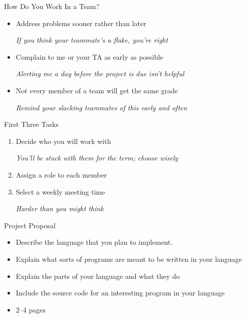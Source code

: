 \documentclass{plt}
\begin{document}
\begin{frame}{How Do You Work In a Team?}


  \begin{itemize}
    \itemsep=15pt
\item Address problems sooner rather than later

\emph{If you think your teammate's a flake, you're right}

\item Complain to me or your TA as early as possible

\emph{Alerting me a day before the project is due isn't helpful}

\item Not every member of a team will get the same grade

\emph{Remind your slacking teammates of this early and often}
\end{itemize}

\end{frame}

\begin{frame}{First Three Tasks}

  \begin{enumerate}
    \itemsep=15pt
\item Decide who you will work with

\emph{You'll be stuck with them for the term; choose wisely}

\item Assign a role to each member

\item Select a weekly meeting time

\emph{Harder than you might think}
\end{enumerate}


\end{frame}

\begin{frame}{Project Proposal}

  \begin{itemize}
    \itemsep=15pt

\item Describe the language that you plan to implement.

\item Explain what sorts of programs are meant to be written in your language

\item Explain the parts of your language and what they do

\item Include the source code for an interesting program in your language

\item 2--4 pages
\end{itemize}

\end{frame}
\end{document}
